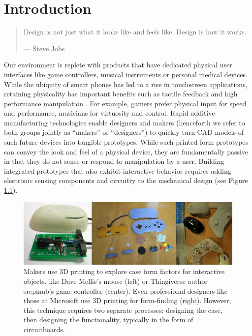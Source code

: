 \chapter{Introduction}

\begin{quote}
Design is not just what it looks like and feels like. Design is how it works.

--- Steve Jobs
\end{quote}

Our environment is replete with products that have dedicated physical user interfaces like game controllers, musical instruments or personal medical devices. While the ubiquity of smart phones has led to a rise in touchscreen applications, retaining physicality has important benefits such as tactile feedback and high performance manipulation \cite{klemmer-bodies}. For example, gamers prefer physical input for speed and performance, musicians for virtuosity and control. Rapid additive manufacturing technologies enable designers and makers (henceforth we refer to both groups jointly as ``makers'' or ``designers'') to quickly turn CAD models of such future devices into tangible prototypes. While such printed form prototypes can convey the look and feel of a physical device, they are fundamentally passive in that they do not sense or respond to manipulation by a user. Building integrated prototypes that also exhibit interactive behavior requires adding electronic sensing components and circuitry to the mechanical design (see Figure \ref{fig:3dcases}).

\begin{figure}
\centering
\includegraphics{figures/3dcases.png}
\caption{Makers use 3D printing to explore case form factors for interactive objects, like Dave Mellis's mouse (left) or Thingiverse author srepmub's game controller (center). Even professional designers like those at Microsoft use 3D printing for form-finding (right). However, this technique requires two separate processes: designing the case, then designing the functionality, typically in the form of circuitboards.}
\label{fig:3dcases}
\end{figure}

